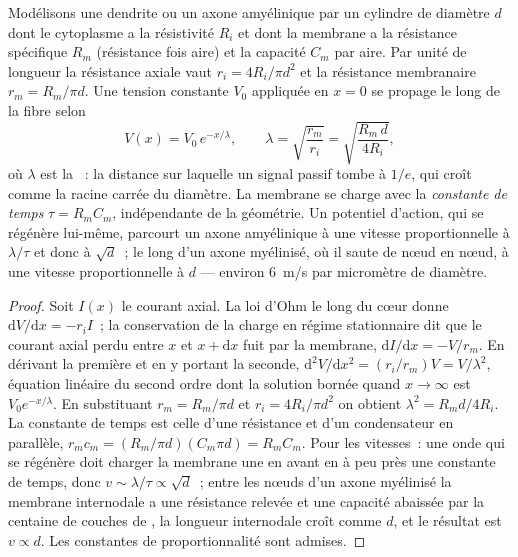 \begin{theorem}\label{thm:b3:nervous-systems:cable}
Modélisons une dendrite ou un axone amyélinique par un cylindre de
diamètre $d$ dont le cytoplasme a la résistivité $R_{i}$ et dont la
membrane a la résistance spécifique $R_{m}$ (résistance fois aire) et la
capacité $C_{m}$ par aire. Par unité de longueur la résistance axiale
vaut $r_{i} = 4R_{i}/\pi d^{2}$ et la résistance membranaire
$r_{m} = R_{m}/\pi d$. Une tension constante $V_{0}$ appliquée en
$x = 0$ se propage le long de la fibre selon
\[
V(x) = V_{0}\,e^{-x/\lambda}, \qquad
\lambda = \sqrt{\frac{r_{m}}{r_{i}}} = \sqrt{\frac{R_{m}\,d}{4R_{i}}},
\]
où $\lambda$ est la \emph{}~: la distance sur laquelle
un signal passif tombe à $1/e$, qui croît comme la racine carrée du
diamètre. La membrane se charge avec la \emph{constante de temps} $\tau =
R_{m}C_{m}$, indépendante de la géométrie. Un potentiel d'action, qui se
régénère lui-même, parcourt un axone amyélinique à une vitesse
proportionnelle à $\lambda/\tau$ et donc à $\sqrt{d}$~; le long d'un
axone myélinisé, où il saute de nœud en nœud, à une vitesse
proportionnelle à $d$ --- environ \qty{6}{m/s} par micromètre de diamètre.
\end{theorem}
\begin{proof}
Soit $I(x)$ le courant axial. La loi d'Ohm le long du cœur donne
$\mathrm{d}V/\mathrm{d}x = -r_{i}I$~; la conservation de la charge en
régime stationnaire dit que le courant axial perdu entre $x$ et
$x + \mathrm{d}x$ fuit par la membrane,
$\mathrm{d}I/\mathrm{d}x = -V/r_{m}$. En dérivant la première et en y
portant la seconde,
$\mathrm{d}^{2}V/\mathrm{d}x^{2} = (r_{i}/r_{m})V = V/\lambda^{2}$,
équation linéaire du second ordre dont la solution bornée quand
$x \to \infty$ est $V_{0}e^{-x/\lambda}$. En substituant
$r_{m} = R_{m}/\pi d$ et $r_{i} =
4R_{i}/\pi d^{2}$ on obtient $\lambda^{2} = R_{m}d/4R_{i}$. La constante
de temps est celle d'une résistance et d'un condensateur en parallèle,
$r_{m}c_{m} =
(R_{m}/\pi d)(C_{m}\pi d) = R_{m}C_{m}$. Pour les vitesses~: une onde
qui se régénère doit charger la membrane une  en avant
en à peu près une constante de temps, donc
$v \sim \lambda/\tau \propto \sqrt{d}$~; entre les nœuds d'un axone
myélinisé la membrane internodale a une résistance relevée et une
capacité abaissée par la centaine de couches de , la longueur
internodale croît comme $d$, et le résultat est $v \propto d$. Les
constantes de proportionnalité sont admises.
\end{proof}

